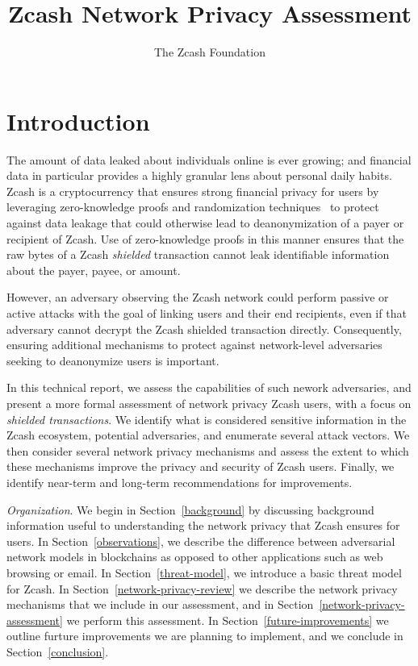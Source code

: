 \documentclass{article}
\title{Zcash Network Privacy Assessment}
\author{The Zcash Foundation}
\begin{document}
    \maketitle
\section{Introduction}

The amount of data leaked about individuals online is ever growing; and
financial data in particular
provides a highly granular lens about personal daily habits.
Zcash is a cryptocurrency that ensures strong financial
privacy for users by leveraging zero-knowledge proofs and randomization
techniques~\cite{zcash-spec} to
protect against data leakage that could otherwise lead to deanonymization of a
payer or
recipient of Zcash. Use of zero-knowledge proofs in this manner ensures that
the raw bytes of a Zcash \emph{shielded} transaction cannot leak identifiable
information about the payer, payee, or amount.

However, an adversary observing the Zcash network
could perform passive or active attacks with the goal of linking
users and their end recipients, even if that adversary cannot decrypt the Zcash
shielded transaction directly. Consequently, ensuring additional mechanisms to
protect against network-level adversaries seeking to deanonymize users is
important.

In this technical report, we assess the capabilities of such nework
adversaries, and present a more formal assessment of network privacy Zcash
users, with a focus on \textit{shielded
transactions}. We identify what is considered sensitive information in the Zcash
ecosystem, potential adversaries, and enumerate several attack vectors.
We then consider several
network privacy mechanisms and assess the extent to which these
mechanisms improve the privacy and security of Zcash users. Finally, we
identify near-term and long-term recommendations for improvements.

\textit{Organization}.
We begin in Section~\ref{background} by discussing background information
useful to understanding the network privacy that Zcash ensures for users. In
Section~\ref{observations}, we describe the difference between adversarial
network models in blockchains as opposed to other applications such as web
browsing or email. In
Section~\ref{threat-model}, we introduce a basic threat model for Zcash.
In Section~\ref{network-privacy-review} we describe the network
privacy mechanisms that we include in our assessment, and in
Section~\ref{network-privacy-assessment} we perform this assessment.
In Section~\ref{future-improvements} we outline furture improvements we are
planning to implement, and we conclude in Section~\ref{conclusion}.
\end{document}
